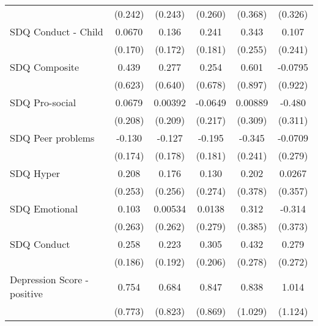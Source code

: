 {\begin{tabular}{l*{5}{c}}
            &     (0.242)         &     (0.243)         &     (0.260)         &     (0.368)         &     (0.326)         \\
\addlinespace
SDQ Conduct - Child&      0.0670         &       0.136         &       0.241         &       0.343         &       0.107         \\
            &     (0.170)         &     (0.172)         &     (0.181)         &     (0.255)         &     (0.241)         \\
\addlinespace
SDQ Composite&       0.439         &       0.277         &       0.254         &       0.601         &     -0.0795         \\
            &     (0.623)         &     (0.640)         &     (0.678)         &     (0.897)         &     (0.922)         \\
\addlinespace
SDQ Pro-social&      0.0679         &     0.00392         &     -0.0649         &     0.00889         &      -0.480         \\
            &     (0.208)         &     (0.209)         &     (0.217)         &     (0.309)         &     (0.311)         \\
\addlinespace
SDQ Peer problems&      -0.130         &      -0.127         &      -0.195         &      -0.345         &     -0.0709         \\
            &     (0.174)         &     (0.178)         &     (0.181)         &     (0.241)         &     (0.279)         \\
\addlinespace
SDQ Hyper   &       0.208         &       0.176         &       0.130         &       0.202         &      0.0267         \\
            &     (0.253)         &     (0.256)         &     (0.274)         &     (0.378)         &     (0.357)         \\
\addlinespace
SDQ Emotional&       0.103         &     0.00534         &      0.0138         &       0.312         &      -0.314         \\
            &     (0.263)         &     (0.262)         &     (0.279)         &     (0.385)         &     (0.373)         \\
\addlinespace
SDQ Conduct &       0.258         &       0.223         &       0.305         &       0.432         &       0.279         \\
            &     (0.186)         &     (0.192)         &     (0.206)         &     (0.278)         &     (0.272)         \\
\addlinespace
Depression Score - positive&       0.754         &       0.684         &       0.847         &       0.838         &       1.014         \\
            &     (0.773)         &     (0.823)         &     (0.869)         &     (1.029)         &     (1.124)         \\
\bottomrule
\end{tabular}
}
